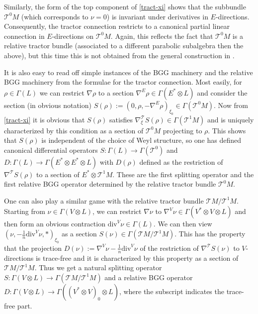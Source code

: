 \documentclass[11pt]{amsart}
\numberwithin{proposition}{section}
\numberwithin{equation}{section}
\begin{document}
Similarly, the form of the top component of \eqref{tract-xi} shows that the subbundle $\mathcal T^0M$ (which corresponds to $\nu=0$) is invariant under derivatives in $E$-directions. Consequently, the tractor connection restricts to a canonical partial linear connection in $E$-directions on $\mathcal T^0M$. Again, this reflects the fact that $\mathcal T^0M$ is a relative tractor bundle (associated to a different parabolic subalgebra then the above), but this time this is not obtained from the general construction in \cite{Relative}.  

It is also easy to read off simple instances of the BGG machinery and the relative BGG machinery from the formulae for the tractor connection. Most easily, for $\rho\in\Gamma(L)$ we can restrict $\nabla\rho$ to a section $\nabla^E\rho\in\Gamma(E^*\otimes L)$ and consider the section (in obvious notation) $S(\rho):=(0,\rho,-\nabla^E\rho)_{\xi_0}\in\Gamma(\mathcal T^0M)$. Now from \eqref{tract-xi} it is obvious that $S(\rho)$ satisfies $\nabla^{\mathcal T}_\xi S(\rho)\in\Gamma(\mathcal T^1M)$ and is uniquely characterized by this condition as a section of $\mathcal T^0M$ projecting to $\rho$. This shows that $S(\rho)$ is independent of the choice of Weyl structure, so one has defined canonical differential operators $S:\Gamma(L)\to\Gamma(\mathcal T^0)$ and $D:\Gamma(L)\to\Gamma(E^*\otimes E^*\otimes L)$ with $D(\rho)$ defined as the restriction of $\nabla^{\mathcal T}S(\rho)$ to a section of $E^*\otimes\mathcal T^1M$. These are the first splitting operator and the first relative BGG operator determined by the relative tractor bundle $\mathcal T^0M$. 

One can also play a similar game with the relative tractor bundle $\mathcal TM/\mathcal T^1M$. Starting from $\nu\in\Gamma(V\otimes L)$, we can restrict $\nabla\nu$ to $\nabla^V\nu\in\Gamma(V^*\otimes V\otimes L)$ and then form an obvious contraction $\text{div}^V\nu\in\Gamma(L)$. We can then view $(\nu,-\tfrac1n\text{div}^V\nu,*)_{\xi_0}$ as a section $S(\nu)\in\Gamma(\mathcal TM/\mathcal T^1M)$. This has the property that the projection $D(\nu):=\nabla^V\nu-\tfrac1n\text{div}^V\nu$ of the restriction of $\nabla^{\mathcal T}S(\nu)$ to $V$-directions is trace-free and it is characterized by this property as a section of $\mathcal TM/\mathcal T^1M$. Thus we get a natural splitting operator $S:\Gamma(V\otimes L)\to\Gamma(\mathcal TM/\mathcal T^1M)$ and a relative BGG operator $D:\Gamma(V\otimes L)\to\Gamma((V^*\otimes V)_0\otimes L)$, where the subscript indicates the trace-free part.   
\end{document}
